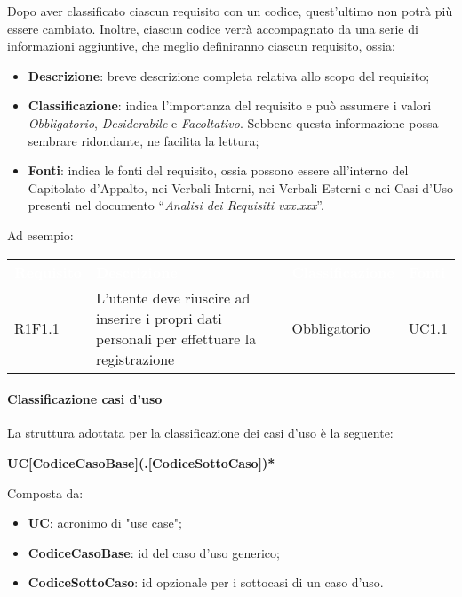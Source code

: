 Dopo aver classificato ciascun requisito con un codice, quest’ultimo non potrà più essere cambiato.
Inoltre, ciascun codice verrà accompagnato da una serie di informazioni aggiuntive, che meglio definiranno ciascun requisito, ossia:

\begin{itemize}
	\item \textbf{Descrizione}: breve descrizione completa relativa allo scopo del requisito;
	\item \textbf{Classificazione}: indica l’importanza del requisito e può assumere i valori \textit{Obbligatorio}, \textit{Desiderabile} e \textit{Facoltativo}. Sebbene questa informazione possa sembrare ridondante, ne facilita la lettura;
	\item \textbf{Fonti}: indica le fonti del requisito, ossia possono essere all'interno del Capitolato d’Appalto, nei Verbali Interni, nei Verbali Esterni e nei Casi d’Uso presenti nel documento “\textit{Analisi dei Requisiti vxx.xxx}”.
\end{itemize}

Ad esempio:\\

\begin{table}[!htbp]
\renewcommand{\arraystretch}{1.5}
\begin{tabular}{ m{}<{\centering}  m{}<{\centering}  m{}<{\centering}  m{}<{\centering}}
	\rowcolor{darkblue}
	\textcolor{white}{\textbf{Requisito}} &\textcolor{white}{\textbf{Descrizione}}& \textcolor{white}{\textbf{Classificazione}} & \textcolor{white}{\textbf{Fonti}}\\ 

	\rowcolor{gray!10} R1F1.1 & L’utente deve riuscire ad inserire i propri dati personali per effettuare la registrazione & Obbligatorio & UC1.1 \\	

\end{tabular}
\end{table}

\paragraph{Classificazione casi d'uso}
La struttura adottata per la classificazione dei casi d'uso è la seguente: \\
\centerline{\textbf{UC[CodiceCasoBase](.[CodiceSottoCaso])*}}
Composta da:
\begin{itemize}
\item \textbf{UC}: acronimo di "use case";
\item \textbf{CodiceCasoBase}: id del caso d'uso generico;
\item \textbf{CodiceSottoCaso}: id opzionale per i sottocasi di un caso d'uso.
\end{itemize}

